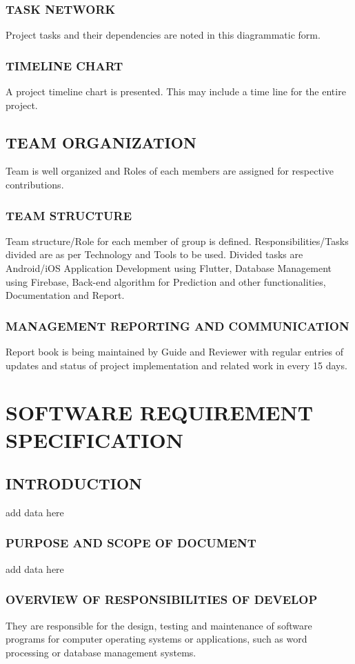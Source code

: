 \documentclass[12pt,a4paper]{report}
\begin{document}
\subsection{TASK NETWORK}
Project tasks and their dependencies are noted in this diagrammatic form.
\subsection{TIMELINE CHART}
A project timeline chart is presented. This may include a time line for the entire project.  

\section{TEAM ORGANIZATION}
Team is well organized and Roles of each members are assigned for respective contributions.
\subsection{TEAM STRUCTURE}
Team structure/Role for each member of group is defined. Responsibilities/Tasks divided are as per Technology and Tools to be used. Divided tasks are Android/iOS Application Development using Flutter, Database Management using Firebase, Back-end algorithm for Prediction and other functionalities, Documentation and Report.
\subsection{MANAGEMENT REPORTING AND COMMUNICATION}
Report book is being maintained by Guide and Reviewer with regular entries of updates and status of project implementation and related work in every 15 days.

\chapter{SOFTWARE REQUIREMENT SPECIFICATION}
\section{INTRODUCTION}
add data here
\subsection{PURPOSE AND SCOPE OF DOCUMENT}
add data here
\subsection{OVERVIEW OF RESPONSIBILITIES OF DEVELOP}
They are responsible for the design, testing and maintenance of software programs  for computer operating systems or applications, such as word  processing or database management systems.
\end{document}

